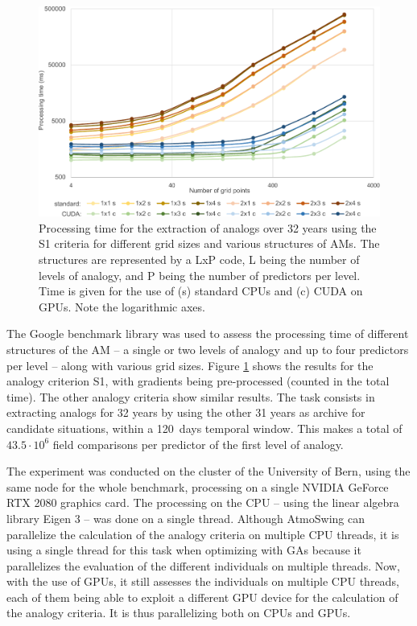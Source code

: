 \documentclass[draft]{agujournal2019}
\begin{document}
\begin{figure}
	\noindent\includegraphics[width=130mm]{figures/cuda-timing.pdf}
	\caption{Processing time for the extraction of analogs over 32 years using the S1 criteria for different grid sizes and various structures of AMs. The structures are represented by a LxP code, L being the number of levels of analogy, and P being the number of predictors per level. Time is given for the use of (s) standard CPUs and (c) CUDA on GPUs. Note the logarithmic axes.}
	\label{cuda}
\end{figure}

The Google benchmark library was used to assess the processing time of different structures of the AM -- a single or two levels of analogy and up to four predictors per level -- along with various grid sizes. Figure \ref{cuda} shows the results for the analogy criterion S1, with gradients being pre-processed (counted in the total time). The other analogy criteria show similar results. The task consists in extracting analogs for 32 years by using the other 31 years as archive for candidate situations, within a 120~days temporal window. This makes a total of $43.5\cdot10^6$ field comparisons per predictor of the first level of analogy.

The experiment was conducted on the cluster of the University of Bern, using the same node for the whole benchmark, processing on a single NVIDIA GeForce RTX 2080 graphics card. The processing on the CPU -- using the linear algebra library Eigen 3 \cite{Guennebaud2010} -- was done on a single thread. Although AtmoSwing can parallelize the calculation of the analogy criteria on multiple CPU threads, it is using a single thread for this task when optimizing with GAs because it parallelizes the evaluation of the different individuals on multiple threads. Now, with the use of GPUs, it still assesses the individuals on multiple CPU threads, each of them being able to exploit a different GPU device for the calculation of the analogy criteria. It is thus parallelizing both on CPUs and GPUs.
\end{document}
